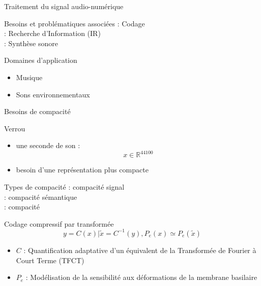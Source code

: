 \begin{frame}{Traitement du signal audio-numérique}
\begin{block}{Besoins et problématiques associées}
: Codage \\
: Recherche d'Information (IR) \\
: Synthèse sonore
\end{block}
\begin{block}{Domaines d'application}
\begin{itemize}
\item Musique
\item Sons environnementaux
\end{itemize}
\end{block}
\end{frame}


\begin{frame}{Besoins de compacité}
\begin{block}{Verrou}
\begin{itemize}
\item une seconde de son : $$ x \in \mathbb{R}^{44100}$$
\item besoin d'une représentation plus \alert{compacte}
\end{itemize}
\end{block}
\begin{block}{Types de compacité}
: compacité signal \\ %
: compacité sémantique \\ %
: compacité \alert{\og}  \alert{\fg} \\ %
\end{block}
\end{frame}

\begin{frame}{Codage compressif par transformée}
$$y = C(x) | \tilde{x} = C^{-1}(y), P_e(x) \simeq P_e(\tilde{x})$$
\begin{itemize}
\item $C$ : Quantification adaptative d'un équivalent de la Transformée de Fourier à Court Terme (TFCT)
\item $P_e$ : Modélisation de la sensibilité aux déformations de la membrane basilaire
\end{itemize}
\end{frame}

